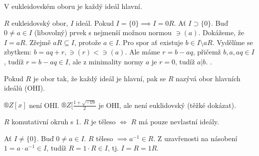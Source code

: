 \documentclass[12pt]{article}                   %
\begin{document}
        \begin{veta}
            V eukleidovském oboru je každý ideál hlavní.

            \begin{dukazin}
                $R$ eukleidovský obor, $I$ ideál. Pokud $I = \{0\} \implies I = 0R$. Ať $I \supset \{0\}$. Buď $0 ≠ a \in I$ (libovolný) prvek s nejmenší možnou normou $\ni(a)$. Dokážeme, že $I = aR$. Zřejmě $aR \subseteq I$, protože $a \in I$. Pro spor ať existuje $b \in I \setminus aR$. Vydělíme se zbytkem: $b = aq + r, \ni(r)<\ni(a)$. Ale máme $r = b-aq$, přičemž $b, a, aq \in I$, tudíž $r = b-aq \in I$, ale z minimality normy $a$ je $r = 0$, tudíž $a | b$. \lightning.
            \end{dukazin}
        \end{veta}

        \begin{definice}
            Pokud $R$ je obor tak, že každý ideál je hlavní, pak se $R$ nazývá obor hlavních ideálů (OHI).
        \end{definice}

        \begin{priklady}
            $®Z[x]$ není OHI. $®Z[\frac{1 + \sqrt{-19}}{2}$ je OHI, ale není euklidovský (těžké dokázat).
        \end{priklady}

        \begin{tvrzeni}
            $R$ komutativní okruh s 1. $R$ je těleso $\Leftrightarrow$ $R$ má pouze nevlastní ideály.

            \begin{dukazin}
                Ať $I ≠ \{0\}$. Buď $0 ≠ a \in I$. $R$ těleso $\implies a^{-1} \in R$. Z uzavřenosti na násobení $1 = a·a^{-1} \in I$, tudíž $R = 1·R \in I$, tj. $I = R = 1R$.
            \end{dukazin}
        \end{tvrzeni}
\end{document}
